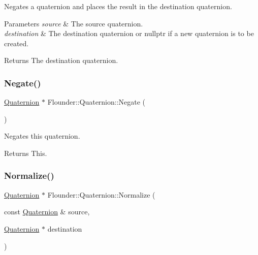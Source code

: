 Negates a quaternion and places the result in the destination quaternion. 


\begin{DoxyParams}{Parameters}
{\em source} & The source quaternion. \\
\hline
{\em destination} & The destination quaternion or nullptr if a new quaternion is to be created. \\
\hline
\end{DoxyParams}
\begin{DoxyReturn}{Returns}
The destination quaternion. 
\end{DoxyReturn}
\mbox{\label{class_flounder_1_1_quaternion_aee4bd352c9577236da75b9740988368c}} 
\subsubsection{\texorpdfstring{Negate()}{Negate()}\hspace{0.1cm}{\footnotesize\ttfamily [2/2]}}
{\footnotesize\ttfamily \hyperlink{class_flounder_1_1_quaternion}{Quaternion} $\ast$ Flounder\+::\+Quaternion\+::\+Negate (\begin{DoxyParamCaption}{ }\end{DoxyParamCaption})}



Negates this quaternion. 

\begin{DoxyReturn}{Returns}
This. 
\end{DoxyReturn}
\mbox{\label{class_flounder_1_1_quaternion_aad79217aa0a508eb7df64043ca40c410}} 
\subsubsection{\texorpdfstring{Normalize()}{Normalize()}\hspace{0.1cm}{\footnotesize\ttfamily [1/2]}}
{\footnotesize\ttfamily \hyperlink{class_flounder_1_1_quaternion}{Quaternion} $\ast$ Flounder\+::\+Quaternion\+::\+Normalize (\begin{DoxyParamCaption}\item[{const \hyperlink{class_flounder_1_1_quaternion}{Quaternion} \&}]{source,  }\item[{\hyperlink{class_flounder_1_1_quaternion}{Quaternion} $\ast$}]{destination }\end{DoxyParamCaption})\hspace{0.3cm}{\ttfamily [static]}}




